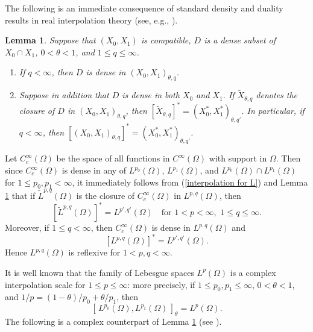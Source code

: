 \documentclass[reqno,centertags,11pt]{amsart}
\newtheorem{lem}[thm]{Lemma}
\theoremstyle{definition}
\numberwithin{thm}{section}
\numberwithin{equation}{section}
\begin{document}
The following is an immediate consequence of  standard  density and duality results in real interpolation theory (see, e.g., \cite[Sections 3.4 and 3.7]{bergh}).

\begin{lem}\label{density and duality in real interp} Suppose that $(X_0 , X_1 )$ is compatible,  $D$ is a dense subset of $X_0 \cap X_1$, $0< \theta < 1$, and $1 \le q \le \infty$.
\begin{enumerate}[{\upshape (i)}]
\item  If $q<\infty$, then $D$ is dense in $\left( X_0 , X_1 \right)_{\theta , q}$.
\item  Suppose in addition that $D$ is dense in both $X_0$ and $X_1$. If $\widetilde{X}_{\theta, q}$ denotes the closure of $D$ in $\left( X_0 , X_1 \right)_{\theta , q}$, then $[\widetilde{X}_{\theta, q}]^* = \left( X_0^* , X_1^* \right)_{\theta , q'}$. In particular, if $  q < \infty$, then $     [\left( X_0 , X_1 \right)_{\theta , q}]^*=\left( X_0^* , X_1^* \right)_{\theta , q'}$.
\end{enumerate}
\end{lem}

Let $C_c^\infty (\Omega )$ be the space of all functions in $C^\infty (\Omega )$ with support in $\Omega$. Then since $C_c^\infty (\Omega )$ is dense in any of   $L^{p_0}(\Omega ) $,   $  L^{p_1}(\Omega )$, and   $L^{p_0}(\Omega )\cap L^{p_1}(\Omega )$ for $1 \le p_0 ,p_1 <\infty$, it immediately follows from (\ref{interpolation for L}) and Lemma \ref{density and duality in real interp} that    if $\widetilde{L}^{p,q}(\Omega )$ is the closure of $C_c^\infty (\Omega )$ in $L^{p,q}(\Omega )$, then
\begin{equation}\label{widehat-L}
\left[ \widetilde{L}^{p,q} (\Omega )\right]^*
= L^{p',q'} (\Omega )  \quad\mbox{for}\,\, 1<p<\infty, \,\,1 \le q \le \infty.
\end{equation}
Moreover, if $1 \le q  <  \infty$, then $C_c^\infty (\Omega )$ is dense in $L^{p,q} (\Omega )$ and
\begin{equation}\label{duality for L}
\left[ L^{p,q} (\Omega )\right]^*
= L^{p',q'} (\Omega ) .
\end{equation}
Hence  $L^{p,q} (\Omega )$ is reflexive for $1 <p,q<\infty$.


It is well known that the family of  Lebesgue spaces  $L^p (\Omega )$ is a  complex interpolation scale for $1 \le p \le \infty$: more precisely,
if $1 \le   p_0 , p_1 \le \infty$,  $0 < \theta <  1$,  and  $1/p=(1-\theta)/p_0 +\theta/p_1$, then
\[
\left[\,  L^{p_0}(\Omega ) , L^{p_1}(\Omega ) \, \right]_{\theta} = L^{p}(\Omega ).
\]
The following  is a  complex counterpart of Lemma \ref{density and duality in real interp} (see  \cite[Sections 4.2 and 4.5]{bergh}).
\end{document}
